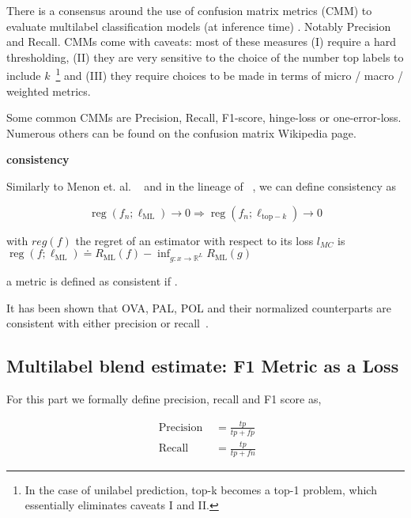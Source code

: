 There is a consensus around the use of confusion matrix metrics (CMM) to evaluate multilabel classification models (at inference time) . Notably Precision and Recall. CMMs come with caveats: most of these measures (I) require a hard thresholding, (II) they are very sensitive to the choice of the number top labels to include $k$~\footnote{In the case of unilabel prediction, top-k becomes a top-1 problem, which essentially eliminates caveats I and II.} and (III) they require choices to be made in terms of  micro / macro / weighted metrics.

Some common CMMs are Precision, Recall, F1-score, hinge-loss or one-error-loss. Numerous others can be found on the confusion matrix Wikipedia page.


\textbf{consistency}

Similarly to Menon et. al. ~\citep{multilabelReduction} and in the lineage of ~\citep{consistency-surrogates, consistency-multiclassSVM, consistency-lossAnalysis}, we can define consistency as

\begin{equation}
\operatorname{reg}\left(f_{n} ; \ell_{\mathrm{ML}}\right) \rightarrow 0 \Longrightarrow \operatorname{reg}\left(f_{n} ; \ell_{\mathrm{top}-k}\right) \rightarrow 0
\end{equation}

with $reg(f)$ the regret of an estimator with respect to its loss $l_{MC}$ is $\operatorname{reg}\left(f ; \ell_{\mathrm{ML}}\right) \doteq R_{\mathrm{ML}}(f)-\inf _{g: x \rightarrow \mathbb{R}^{L}} R_{\mathrm{ML}}(g)$

a metric is defined as consistent if .

It has been shown that OVA, PAL, POL and their normalized counterparts are consistent with either precision or recall~\cite{multilabelReduction}. 


\subsection{Multilabel blend estimate: F1 Metric as a Loss}
\label{section:background:metricsAsLosses}

For this part we formally define precision, recall and F1 score as,

\begin{equation}
\begin{aligned} \text { Precision } &=\frac{t p}{t p+f p} \\ \text { Recall } &=\frac{t p}{t p+f n} \end{aligned}
\end{equation}

